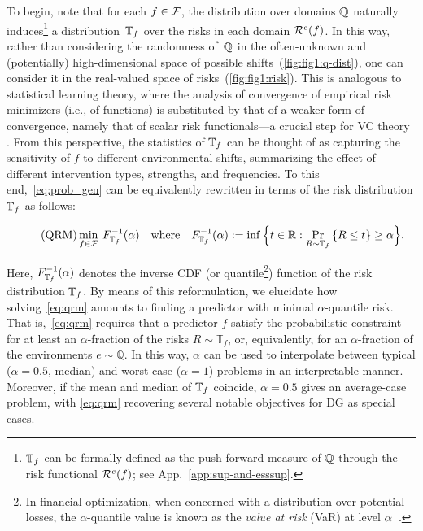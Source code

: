 \documentclass{article}
\begin{document}
 To begin, note
%
that for each $f\in\mathcal{F}$, the distribution over domains $\mathbb{Q}$ naturally induces\footnote{ $\mathbb{T}_f$ can be formally defined as the push-forward measure of $\mathbb{Q}$ through the risk functional $\mathcal{R}^e(f)$; see App.~\ref{app:sup-and-esssup}.} a distribution~$\mathbb{T}_f$ over the risks in each domain $\mathcal{R}^e(f)$.
%
In this way, rather than considering the randomness of~$\mathbb{Q}$ in
%
the often-unknown and (potentially) high-dimensional space of possible 
%
shifts~(\cref{fig:fig1:q-dist}), one can consider it
%
in the real-valued space of risks~(\cref{fig:fig1:risk}).  
This is analogous to statistical learning theory, where the analysis of convergence of empirical risk minimizers (i.e., of functions) is substituted by that of a weaker form of convergence, namely that of scalar risk functionals---a crucial step for VC theory \cite{vapnik1999nature}.
From this perspective, the statistics of $\mathbb{T}_f$ can be thought of as capturing the sensitivity of $f$ to different environmental shifts, summarizing the effect of different intervention types, strengths, and frequencies.  To this end,~\eqref{eq:prob_gen} can be equivalently rewritten in terms of the risk distribution $\mathbb{T}_f$ as follows:
%
\vspace{-0.2em}
\begin{mdframed}[roundcorner=5pt, backgroundcolor=yellow!8,innertopmargin=8pt]
\begin{equation} \tag{QRM}
    \min_{f\in\mathcal{F}} \: F^{-1}_{\mathbb{T}_f}(\alpha) \quad\text{where}\quad F^{-1}_{\mathbb{T}_f}(\alpha) := \inf \Big\{t\in\mathbb{R} : \Pr_{R\sim\mathbb{T}_f} \left\{ R \leq t\right\} \geq \alpha \Big\}. \label{eq:qrm}
\end{equation}
\end{mdframed}
\vspace{-0.8em}
%
Here, $F^{-1}_{\mathbb{T}_f}(\alpha)$ denotes the inverse CDF (or quantile\footnote{In financial optimization, when concerned with a distribution over potential 
%
losses, the $\alpha$-quantile value is known as the \textit{value at risk}
%
(VaR) at level $\alpha$~\citep{duffie1997overview}.}) function of the risk distribution $\mathbb{T}_f$. By means of this reformulation, 
we elucidate how solving~\eqref{eq:qrm} amounts to finding a predictor with minimal $\alpha$-quantile risk.  That is,~\eqref{eq:qrm} requires that a predictor $f$ satisfy the probabilistic constraint for at least an $\alpha$-fraction of the risks $R\sim\mathbb{T}_f$, or, equivalently, for an $\alpha$-fraction of the environments $e\sim\mathbb{Q}$.
In this way, $\alpha$ can be used to interpolate between typical ($\alpha\!=\!0.5$, median) and worst-case ($\alpha\!=\!1$) problems in an interpretable manner. Moreover, if the mean and median of $\mathbb{T}_f$ coincide, $\alpha\!=\!0.5$ gives an average-case problem, with \eqref{eq:qrm} recovering several notable objectives for DG as special cases.
\end{document}
